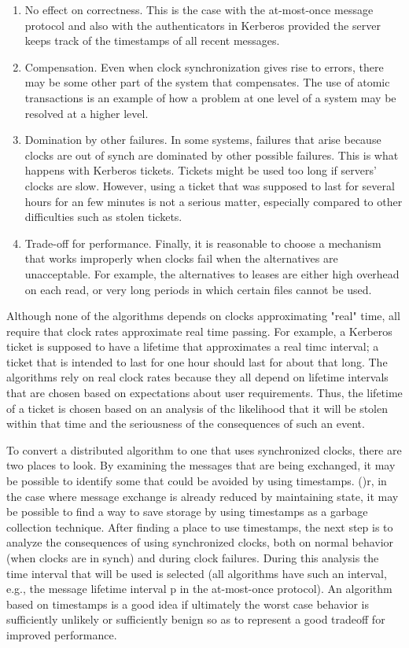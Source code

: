 \documentclass[a4paper,11pt,notitlepage,twoside,openright]{article}
\begin{document}
\begin{enumerate}
\def\labelenumi{\arabic{enumi}.}
\item
  No effect on correctness. This is the case with the at-most-once
  message protocol and also with the authenticators in Kerberos provided
  the server keeps track of the timestamps of all recent messages.
\item
  Compensation. Even when clock synchronization gives rise to errors,
  there may be some other part of the system that compensates. The use
  of atomic transactions is an example of how a problem at one level of
  a system may be resolved at a higher level.
\item
  Domination by other failures. In some systems, failures that arise
  because clocks are out of synch are dominated by other possible
  failures. This is what happens with Kerberos tickets. Tickets might be
  used too long if servers' clocks are slow. However, using a ticket
  that was supposed to last for several hours for an few minutes is not
  a serious matter, especially compared to other difficulties such as
  stolen tickets.
\item
  Trade-off for performance. Finally, it is reasonable to choose a
  mechanism that works improperly when clocks fail when the alternatives
  are unacceptable. For example, the alternatives to leases are either
  high overhead on each read, or very long periods in which certain
  files cannot be used.
\end{enumerate}


Although none of the algorithms depends on clocks approximating "real"
time, all require that clock rates approximate real time passing. For
example, a Kerberos ticket is supposed to have a lifetime that
approximates a real timc interval; a ticket that is intended to last for
one hour should last for about that long. The algorithms rely on real
clock rates because they all depend on lifetime intervals that are
chosen based on expectations about user requirements. Thus, the lifetime
of a ticket is chosen based on an analysis of thc likelihood that it
will be stolen within that time and the seriousness of the consequences
of such an event.

To convert a distributed algorithm to one that uses synchronized clocks,
there are two places to look. By examining the messages that are being
exchanged, it may be possible to identify some that could be avoided by
using timestamps. ()r, in the case where message exchange is already
reduced by maintaining state, it may be possible to find a way to save
storage by using timestamps as a garbage collection technique. After
finding a place to use timestamps, the next step is to analyze the
consequences of using synchronized clocks, both on normal behavior (when
clocks are in synch) and during clock failures. During this analysis the
time interval that will be used is selected (all algorithms have such an
interval, e.g., the message lifetime interval p in the at-most-once
protocol). An algorithm based on timestamps is a good idea if ultimately
the worst case behavior is sufficiently unlikely or sufficiently benign
so as to represent a good tradeoff for improved performance.
\end{document}
